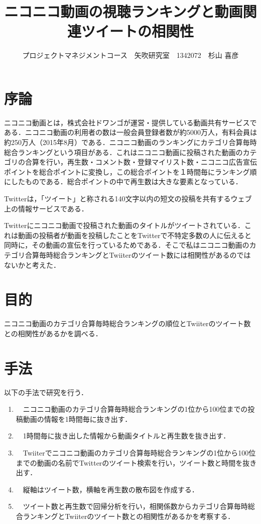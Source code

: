 \documentclass[uplatex,twocolumn,dvipdfmx]{jsarticle}
\title{\vspace{-5mm}\fontsize{14pt}{0pt}\selectfont ニコニコ動画の視聴ランキングと動画関連ツイートの相関性 }
\author{\normalsize プロジェクトマネジメントコース　矢吹研究室　1342072　杉山 喜彦}
\date{}
\begin{document}
\fontsize{10.5pt}{\baselineskip}\selectfont
\maketitle





\section{序論}

ニコニコ動画とは，株式会社ドワンゴが運営・提供している動画共有サービスである．ニコニコ動画の利用者の数は一般会員登録者数が約5000万人，有料会員は約250万人（2015年8月）である\cite{iii}．ニコニコ動画のランキングにカテゴリ合算毎時総合ランキングという項目がある．これはニコニコ動画に投稿された動画のカテゴリの合算を行い，再生数・コメント数・登録マイリスト数・ニコニコ広告宣伝ポイントを総合ポイントに変換し，この総合ポイントを１時間毎にランキング順にしたものである．総合ポイントの中で再生数は大きな要素となっている．

Twitterは，「ツイート」と称される140文字以内の短文の投稿を共有するウェブ上の情報サービスである．

Twitterにニコニコ動画で投稿された動画のタイトルがツイートされている．これは動画の投稿者が動画を投稿したことをTwitterで不特定多数の人に伝えると同時に，その動画の宣伝を行っているためである．そこで私はニコニコ動画のカテゴリ合算毎時総合ランキングとTwiiterのツイート数には相関性があるのではないかと考えた．
\noindent

\section{目的}
ニコニコ動画のカテゴリ合算毎時総合ランキングの順位とTwiiterのツイート数との相関性があるかを調べる．
\section{手法}

以下の手法で研究を行う．

\begin{enumerate}

\item　ニコニコ動画のカテゴリ合算毎時総合ランキングの1位から100位までの投稿動画の情報を1時間毎に抜き出す．
\item　1時間毎に抜き出した情報から動画タイトルと再生数を抜き出す．
\item　Twiiterでニコニコ動画のカテゴリ合算毎時総合ランキングの1位から100位までの動画の名前でTwitterのツイート検索を行い，ツイート数と時間を抜き出す．
\item　縦軸はツイート数，横軸を再生数の散布図を作成する．
\item　ツイート数と再生数で回帰分析を行い，相関係数からカテゴリ合算毎時総合ランキングとTwiiterのツイート数との相関性があるかを考察する．

\end{enumerate}
\end{document}
